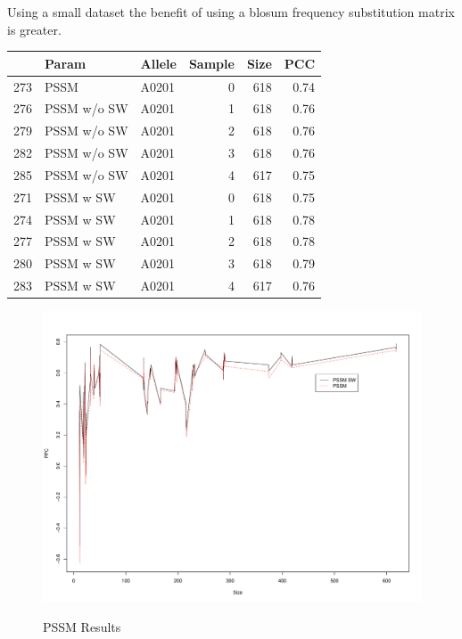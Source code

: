 Using a small dataset the benefit of using a blosum frequency substitution matrix is greater.

\begin{table}[ht]
\begin{center}
\begin{tabular}{rllrrr}
  \hline
 & Param & Allele & Sample & Size & PCC \\ 
  \hline
273 & PSSM & A0201 &   0 & 618 & 0.74 \\ 
  276 & PSSM w/o SW & A0201 &   1 & 618 & 0.76 \\ 
  279 & PSSM w/o SW & A0201 &   2 & 618 & 0.76 \\ 
  282 & PSSM w/o SW & A0201 &   3 & 618 & 0.76 \\ 
  285 & PSSM w/o SW & A0201 &   4 & 617 & 0.75 \\ 
  271 & PSSM w SW & A0201 &   0 & 618 & 0.75 \\ 
  274 & PSSM w SW & A0201 &   1 & 618 & 0.78 \\ 
  277 & PSSM w SW & A0201 &   2 & 618 & 0.78 \\ 
  280 & PSSM w SW & A0201 &   3 & 618 & 0.79 \\ 
  283 & PSSM w SW & A0201 &   4 & 617 & 0.76 \\ 
   \hline
\end{tabular}
\end{center}
\end{table}

\begin{figure}
\begin{center}
\includegraphics[width=12cm]{fig/pssm1.pdf}
\label{fig:pssm1}
\caption{PSSM Results}
\end{center}
\end{figure}

